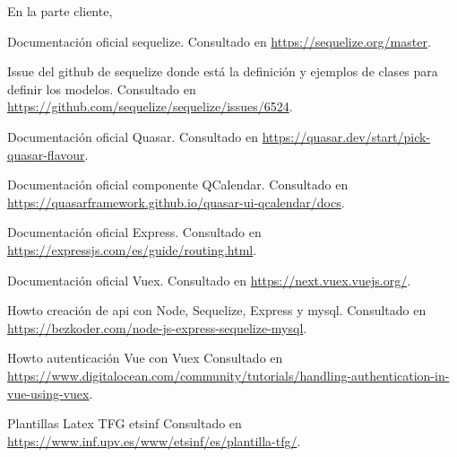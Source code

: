 \documentclass[11pt,spanish,listoffigures,listoftables]{tfgetsinf}
\begin{document}
En la parte cliente, 


\begin{thebibliography}{10}

   Documentación oficial sequelize.
   \newblock Consultado en 
   \url{https://sequelize.org/master}.

   Issue del github de sequelize donde está la definición y ejemplos de clases para definir los modelos.
   \newblock Consultado en
   \url{https://github.com/sequelize/sequelize/issues/6524}.

   Documentación oficial Quasar.
   \newblock Consultado en 
   \url{https://quasar.dev/start/pick-quasar-flavour}.

   Documentación oficial componente QCalendar.
   \newblock Consultado en 
   \url{https://quasarframework.github.io/quasar-ui-qcalendar/docs}.

   Documentación oficial Express.
   \newblock Consultado en 
   \url{https://expressjs.com/es/guide/routing.html}.

  Documentación oficial Vuex.
   \newblock Consultado en 
   \url{https://next.vuex.vuejs.org/}.

   Howto creación de api con Node, Sequelize, Express y mysql.
   \newblock Consultado en
   \url{https://bezkoder.com/node-js-express-sequelize-mysql}.

   Howto autenticación Vue con Vuex
   \newblock Consultado en
   \url{https://www.digitalocean.com/community/tutorials/handling-authentication-in-vue-using-vuex}.

   Plantillas Latex TFG etsinf
   \newblock Consultado en
   \url{https://www.inf.upv.es/www/etsinf/es/plantilla-tfg/}.

   

\end{thebibliography}
\cleardoublepage









\end{document}
